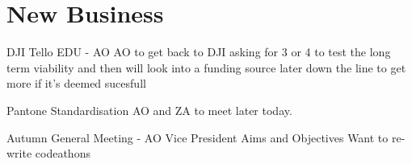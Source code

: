\documentclass[11pt]{meetingmins}
\begin{document}
\section{New Business}
\begin{items}
	\item DJI Tello EDU - AO
		\subitem AO to get back to DJI asking for 3 or 4 to test the long term viability and then will look into a funding source later down the line to get more if it's deemed sucesfull
	\item Pantone Standardisation
		\subitem AO and ZA to meet later today.
	\item Autumn General Meeting - AO
		\subitem Vice President
			\subsubitem 
		\subitem Aims and Objectives
			\subsubitem Want to re-write codeathons
\end{items}

\vspace{1em}
\nextmeeting{}
\end{document}
